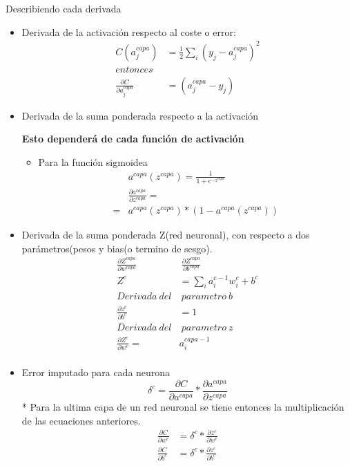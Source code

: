 \par Describiendo cada derivada
\begin{itemize}
    \item Derivada de la activación respecto al coste o error:
        \begin{align*}
            C(a_j^{capa}) &= \frac{1}{2} \sum_i (y_j - a_j^{capa})^2 \\
            entonces & \\
            \frac{\partial C}{\partial a_j^{capa}} &= (a_j^{capa}-y_j)
        \end{align*}
    \item Derivada de la suma ponderada respecto a la activación
        \par \textbf{Esto dependerá de cada función de activación }
        \begin{itemize}
            \item Para la función sigmoidea
                \begin{align*}
                      & a^{capa}(z^{capa}) = \frac{1}{1 + e^{-z^{capa}}} \\
                      & \frac{\partial a^{capa}}{\partial z^{capa}}=\\
                    = &a^{capa}(z^{capa})*(1-a^{capa}(z^{capa}))
                \end{align*}

        \end{itemize}
    \item Derivada de la suma ponderada Z(red neuronal), con respecto a dos
        parámetros(pesos y bias(o termino de sesgo).
        \begin{align*}
            \frac{\partial Z^{capa}}{\partial w^{capa}}  & \ \frac{\partial
            Z^{capa}}{\partial b^{capa}}\\
            Z^{c} & = \sum_i a_i^{c -1} w_i^c + b^c \\
            Derivada\ del &\ parametro\ b\\
            \frac{\partial z^{c}}{\partial b^c} & = 1\\
            Derivada\ del &\ parametro\ z\\
            \frac{\partial Z^c}{\partial w^c} =& a_i^{capa -1}\\
        \end{align*}
    \item Error imputado para cada neurona
        \begin{equation*}
            \delta^c = \frac{\partial C}{\partial a^{capa}} * \frac{\partial
            a^{capa}}{\partial z^{capa}}
        \end{equation*}
        {\tiny ** Para la ultima capa de un red neuronal se tiene entonces la
        multiplicación de las ecuaciones anteriores. }
        \begin{align*}
            \frac{\partial C}{\partial w^{c}} &= \delta^c* \frac{\partial
            z^{c}}{\partial w^{c}} \\
            \frac{\partial C}{\partial b^{c}} &= \delta^c* \frac{\partial
            z^{c}}{\partial b^{c}} \\
        \end{align*}
\end{itemize}

